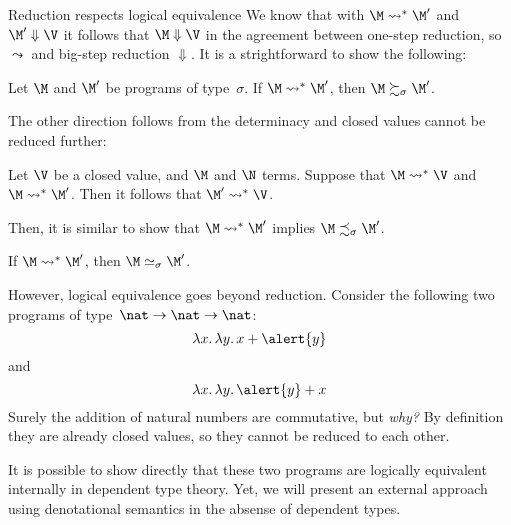 \begin{frame}{Reduction respects logical equivalence}
  We know that with $\M \leadsto^* \M'$ and $\M' \Downarrow \V$ it follows that
  $\M \Downarrow \V$ in the agreement between one-step reduction, so $\leadsto$
  and big-step reduction $\Downarrow$. It is a strightforward to show the
  following:
  \begin{proposition}
    Let $\M$ and $\M'$ be programs of type~$\sigma$. 
    If $\M \leadsto^* \M'$, then $\M \succsim_\sigma \M'$. 
  \end{proposition}
  The other direction follows from the determinacy and closed values cannot be
  reduced further:
  \begin{proposition}
    Let $\V$ be a closed value, and $\M$ and $\N$ terms. 
    Suppose that $\M \leadsto^* \V$ and $\M \leadsto^* \M'$. Then it follows that
    $\M' \leadsto^* \V$. 
  \end{proposition}
  Then, it is similar to show that $\M \leadsto^* \M'$ implies $\M
  \precsim_\sigma \M'$.
  \begin{corollary}
    If $\M \leadsto^* \M'$, then $\M \simeq_\sigma \M'$. 
  \end{corollary}
\end{frame}
\begin{frame}
  However, logical equivalence goes beyond reduction.  
  Consider the following two programs of type~$\nat\to\nat\to\nat$:
    \[
      \lambda x.\, \lambda y.\, x + \alert{y}
    \]
    and 
    \[
      \lambda x.\, \lambda y.\, \alert{y} + x
    \]
    Surely the addition of natural numbers are commutative, but \emph{why?}
    By definition they are already closed values, so they cannot be reduced to
    each other. 
    \begin{remark}
      It is possible to show directly that these two programs are logically
      equivalent internally in dependent type theory. Yet, we will present
      an external approach using denotational semantics in the absense of dependent
      types. 
    \end{remark}
\end{frame}
